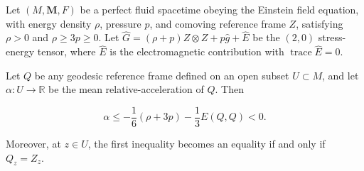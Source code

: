 Let $(M, \mathbf{M}, F)$ be a perfect fluid spacetime obeying the Einstein field equation, with energy density $\rho$, pressure $p$, and comoving reference frame $Z$, satisfying $\rho > 0$ and $\rho \geq 3p \geq 0$. Let $\hat{G} = (\rho + p)Z \otimes Z + p\hat{g} + \hat{E}$ be the $(2,0)$ stress-energy tensor, where $\hat{E}$ is the electromagnetic contribution with $\operatorname{trace} \hat{E} = 0$.

Let $Q$ be any geodesic reference frame defined on an open subset $U \subset M$, and let $\alpha: U \to \mathbb{R}$ be the mean relative-acceleration of $Q$. Then

$$
\alpha \leq -\frac{1}{6}(\rho + 3p) - \frac{1}{3}E(Q, Q) < 0.
$$

Moreover, at $z \in U$, the first inequality becomes an equality if and only if $Q_z = Z_z$.
